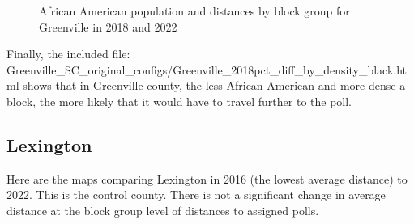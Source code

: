 \documentclass[11pt]{article}
\theoremstyle{remark}
\theoremstyle{definition}
\begin{document}
\begin{figure}
\begin{subfigure}{.5\textwidth}
		\label{sfig:Greenville_2022_bg_dist}
	\end{subfigure}
	\caption{African American population and distances by block group for Greenville in 2018 and 2022}
	\label{fig:Greenville distance Black population maps}
\end{figure}

Finally, the included file: \textrm{Greenville\_SC\_original\_configs/Greenville\_2018pct\_diff\_by\_density\_black.html} shows that in Greenville county, the less African American and more dense a block, the more likely that it would have to travel further to the poll. 

\pagebreak 

\subsection{Lexington}
Here are the maps comparing Lexington in 2016 (the lowest average distance) to 2022. This is the control county. There is not a significant change in average distance at the block group level of distances to assigned polls.
\end{document}
